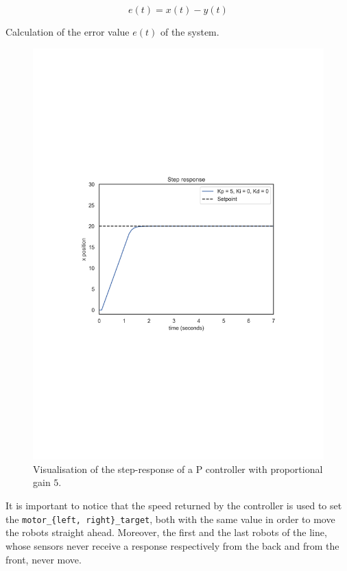 \begin{Equation}[!h]
	\centering
	\begin{equation}
	e(t) = x(t) - y(t)
	\end{equation}
	\caption{Calculation of the error value $e(t)$ of the system.}
	\label{eq:systemerror}
\end{Equation}

\begin{figure}[htb]
	\centering
	\includegraphics[width=.5\textwidth]{contents/images/Step-responsep=kp5ki0kd0}
	\caption[Step response of the proportinal PID controller.]{Visualisation of the 
	step-response of a P controller with proportional 
	gain $5$.}
	\label{fig:pid}
\end{figure}

It is important to notice that the speed returned by the controller is used to set the 
\texttt{motor\_\{left, right\}\_target}, both with the same value in order to move 
the robots straight ahead. Moreover, the first and the last robots of the line, 
whose sensors never receive a response respectively from the back and from the 
front, never move.




